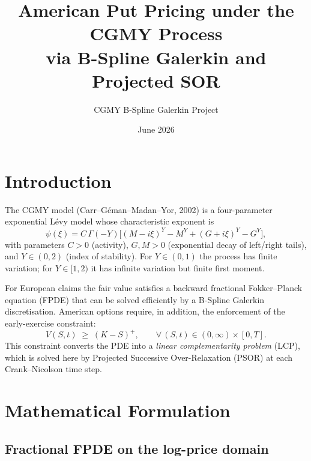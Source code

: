\documentclass[11pt,a4paper]{article}
\title{\textbf{American Put Pricing under the CGMY Process\\
  via B-Spline Galerkin and Projected SOR}}
\author{CGMY B-Spline Galerkin Project}
\date{June 2026}
\begin{document}
\maketitle
\tableofcontents
\bigskip

\section{Introduction}

The CGMY model (Carr--G\'eman--Madan--Yor, 2002) is a four-parameter
exponential L\'evy model whose characteristic exponent is
\begin{equation}
  \psi(\xi) = C\,\Gamma(-Y)
  \bigl[
    (M - i\xi)^Y - M^Y + (G + i\xi)^Y - G^Y
  \bigr],
\end{equation}
with parameters $C>0$ (activity), $G,M>0$ (exponential decay of left/right
tails), and $Y\in(0,2)$ (index of stability).  For $Y\in(0,1)$ the process
has finite variation; for $Y\in[1,2)$ it has infinite variation but finite
first moment.

For European claims the fair value satisfies a backward fractional
Fokker--Planck equation (FPDE) that can be solved efficiently by a B-Spline
Galerkin discretisation.  American options require, in addition, the enforcement
of the early-exercise constraint:
\begin{equation}
  V(S,t) \;\ge\; (K - S)^+, \qquad \forall\,(S,t)\in(0,\infty)\times[0,T].
\end{equation}
This constraint converts the PDE into a \emph{linear complementarity problem}
(LCP), which is solved here by Projected Successive Over-Relaxation (PSOR)
at each Crank--Nicolson time step.

\section{Mathematical Formulation}

\subsection{Fractional FPDE on the log-price domain}
\end{document}
